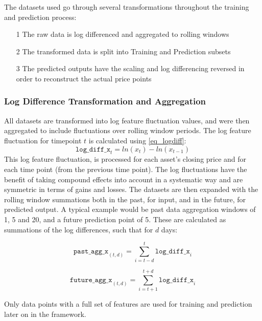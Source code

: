 \documentclass[a4paper,11pt,oneside]{article}
\theoremstyle{plain}
\theoremstyle{definition}
\begin{document}
The datasets used go through several transformations throughout the training and prediction process:

\begin{itemize}
	\item [1] The raw data is log differenced and aggregated to rolling windows
	\item [2] The transformed data is split into Training and Prediction subsets
	\item [3] The predicted outputs have the scaling and log differencing reversed in order to reconstruct the actual price points
\end{itemize}

\subsubsection{Log Difference Transformation and Aggregation}\label{ldata_og_difference}
All datasets are transformed into log feature fluctuation values, and were then aggregated to include fluctuations over rolling window periods. The log feature fluctuation for timepoint $t$ is calculated using \eqref{eq_logdiff}:
\begin{equation}\label{eq_logdiff}
\texttt{log\_diff\_x}_t = ln(x_t) - ln(x_{t-1})
\end{equation}
This log feature fluctuation,  is processed for each asset's closing price and for each time point (from the previous time point). The log fluctuations have the benefit of taking compound effects into account in a systematic way and are symmetric in terms of gains and losses.
\newline\newline
The datasets are then expanded with the rolling window summations both in the past, for input, and in the future, for predicted output. A typical example would be past data aggregation windows of 1, 5 and 20, and a future prediction point of 5. These are calculated as summations of the log differences, such that for $d$ days:

\begin{equation}
\texttt{past\_agg\_x}_{(t,d)} = \sum_{i = t-d}^{t} \texttt{log\_diff\_x}_i
\end{equation}

\begin{equation}
\texttt{future\_agg\_x}_{(t,d)} = \sum_{i = t+1}^{t+d} \texttt{log\_diff\_x}_i
\end{equation}

Only data points with a full set of features are used for training and prediction later on in the framework.
\end{document}

